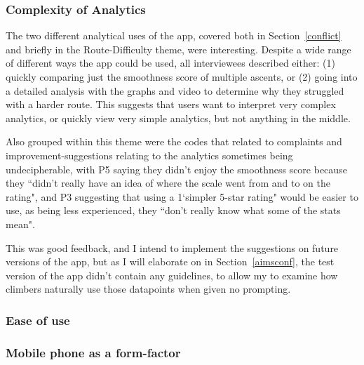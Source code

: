 \subsubsection{Complexity of Analytics}
The two different analytical uses of the app, covered both in Section~\ref{conflict} and briefly in the Route-Difficulty theme, were interesting.
Despite a wide range of different ways the app could be used, all interviewees described either: (1) quickly comparing just the smoothness score of multiple ascents, or (2) going into a detailed analysis with the graphs and video to determine why they struggled with a harder route.
This suggests that users want to interpret very complex analytics, or quickly view very simple analytics, but not anything in the middle.

Also grouped within this theme were the codes that related to complaints and improvement-suggestions relating to the analytics sometimes being undecipherable, with P5 saying they didn't enjoy the smoothness score because they ``didn't really have an idea of where the scale went from and to on the rating", and P3 suggesting that using a 1`simpler 5-star rating" would be easier to use, as being less experienced, they ``don't really know what some of the stats mean".

This was good feedback, and I intend to implement the suggestions on future versions of the app, but as I will elaborate on in Section~\ref{aimsconf}, the test version of the app didn't contain any guidelines, to allow my to examine how climbers naturally use those datapoints when given no prompting.

\subsubsection{Ease of use}


\subsubsection{Mobile phone as a form-factor} 




